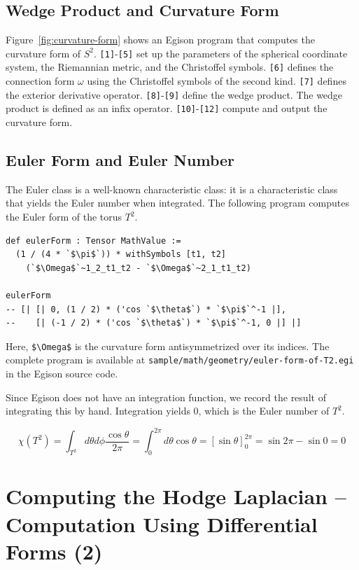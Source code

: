 \subsection{Wedge Product and Curvature Form}

Figure~\ref{fig:curvature-form} shows an Egison program that computes the curvature form of $S^2$.
\texttt{[1]}-\texttt{[5]} set up the parameters of the spherical coordinate system, the Riemannian metric, and the Christoffel symbols.
\texttt{[6]} defines the connection form $\omega$ using the Christoffel symbols of the second kind.
\texttt{[7]} defines the exterior derivative operator.
\texttt{[8]}-\texttt{[9]} define the wedge product.
The wedge product is defined as an infix operator.
\texttt{[10]}-\texttt{[12]} compute and output the curvature form.

\subsection{Euler Form and Euler Number}

The Euler class is a well-known characteristic class: it is a characteristic class that yields the Euler number when integrated.
The following program computes the Euler form of the torus $T^2$.

\begin{lstlisting}[language=egison,numbers=none]
def eulerForm : Tensor MathValue :=
  (1 / (4 * `$\pi$`)) * withSymbols [t1, t2]
    (`$\Omega$`~1_2_t1_t2 - `$\Omega$`~2_1_t1_t2)

eulerForm
-- [| [| 0, (1 / 2) * ('cos `$\theta$`) * `$\pi$`^-1 |],
--    [| (-1 / 2) * ('cos `$\theta$`) * `$\pi$`^-1, 0 |] |]
\end{lstlisting}
Here, \lstinline[mathescape]{$\Omega$} is the curvature form antisymmetrized over its indices.
The complete program is available at \texttt{sample/math/geometry/euler-form-of-T2.egi} in the Egison source code.

Since Egison does not have an integration function, we record the result of integrating this by hand.
Integration yields $0$, which is the Euler number of $T^2$.

\[\chi(T^2) = \int_{T^2} d \theta d \phi \frac{\cos \theta}{2 \pi} = \int_{0}^{2 \pi} d \theta \cos \theta = \left[\sin \theta \right]_{0}^{2 \pi} = \sin 2 \pi - \sin 0 = 0\]

\section{Computing the Hodge Laplacian -- Computation Using Differential Forms (2)}\label{diffgeo-hodge}


